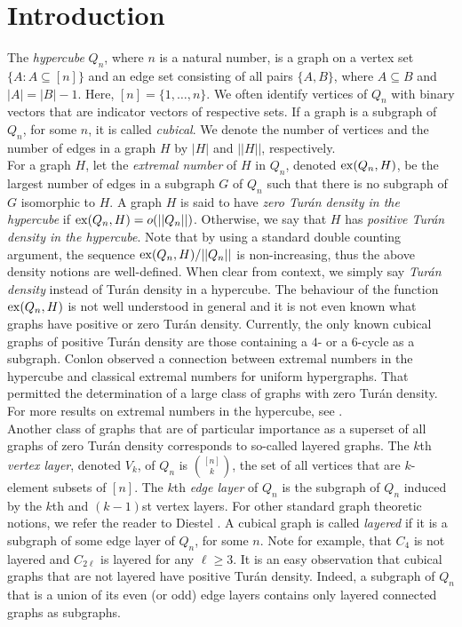 \documentclass[11pt, a4paper]{article}
\newcommand{\ex}{{\rm  ex}}
\begin{document}
	\section{Introduction}
	The {\it hypercube} $Q_n$, where $n$ is a natural number, is a graph on  a vertex set $\{A: A\subseteq [n]\}$ and an edge set consisting of all pairs $\{A,B\}$, where $A\subseteq B$ and $|A|=|B|-1$. Here, $[n]= \{1, \ldots, n\}$. We often identify vertices of $Q_n$ with binary vectors that are indicator vectors of respective sets.  If a graph is a subgraph of $Q_n$, for some $n$, it is called {\it cubical}. We denote the number of vertices and the number of edges in a graph $H$ by  $|H|$ and $||H||$, respectively. \\
	
For a graph $H$, let the {\it extremal number}  of $H$ in $Q_n$, denoted 	$\ex(Q_n, H)$,  be the largest number of edges in a subgraph $G$ of  $Q_n$ such that there is no subgraph of $G$ isomorphic to $H$. 
A graph $H$ is said to have {\it zero Tur\'an density in the hypercube} if $\ex(Q_n, H) = o(||Q_n||)$. Otherwise, we say that $H$ has  {\it positive Tur\'an density in the hypercube}. Note that by using a standard double counting argument,  the sequence $\ex(Q_n, H)/||Q_n||$ is non-increasing, thus the above density notions are well-defined. When clear from context, we simply  say {\it Tur\'an density}  instead of Tur\'an density in a hypercube. 
The behaviour of the function $\ex(Q_n, H)$ is not well understood in general and it is not even known what graphs have positive or zero Tur\'an density.
Currently, the only known cubical graphs of positive Tur\'an density are those containing a $4$- or a $6$-cycle as a subgraph.
Conlon \cite{C} observed a connection between extremal numbers in the hypercube and classical extremal numbers for uniform hypergraphs. That permitted the determination of a large class of  graphs with zero Tur\'an density. For more results on extremal numbers in the hypercube, see  \cite{baber, balogh, AKS, ARSV, AM,TW, O}.\\



Another class of graphs that are of particular importance as a superset of all graphs of zero Tur\'an density corresponds to  so-called layered graphs. The $k$th {\it vertex layer}, denoted $V_k$,  of $Q_n$ is $\binom{[n]}{k}$, the set of all vertices that are $k$-element subsets of $[n]$. The $k$th {\it edge layer} of $Q_n$ is the subgraph of $Q_n$ induced by the $k$th and $(k-1)$st vertex layers.  For other standard graph theoretic notions, we refer the reader to Diestel \cite{D}. 
 A cubical graph is called {\it layered} if it is a subgraph of some edge layer of $Q_n$, for some $n$.  Note for example, that $C_4$ is not layered and $C_{2\ell}$  is layered for  any $\ell\geq 3$. It is an easy observation that cubical graphs that are not layered have positive Tur\'an density. Indeed,  a subgraph of $Q_n$ that is a union of its even (or odd) edge layers contains only layered connected graphs as subgraphs.   \\
\end{document}

